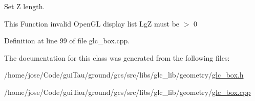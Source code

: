 Set Z length. 

This Function invalid Open\-G\-L display list Lg\-Z must be $>$ 0 

Definition at line 99 of file glc\-\_\-box.\-cpp.



The documentation for this class was generated from the following files\-:\begin{DoxyCompactItemize}
\item 
/home/jose/\-Code/gui\-Tau/ground/gcs/src/libs/glc\-\_\-lib/geometry/\hyperlink{glc__box_8h}{glc\-\_\-box.\-h}\item 
/home/jose/\-Code/gui\-Tau/ground/gcs/src/libs/glc\-\_\-lib/geometry/\hyperlink{glc__box_8cpp}{glc\-\_\-box.\-cpp}\end{DoxyCompactItemize}
